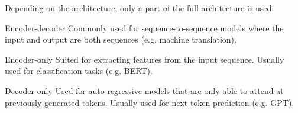 \begin{description}
        \begin{remark}
            Depending on the architecture, only a part of the full architecture is used:
            \begin{descriptionlist}
                \item[Encoder-decoder]
                    Commonly used for sequence-to-sequence models where the input and output are both sequences (e.g. machine translation).
                
                \item[Encoder-only]
                    Suited for extracting features from the input sequence.
                    Usually used for classification tasks (e.g. BERT).
                
                \item[Decoder-only]
                    Used for auto-regressive models that are only able to attend at previously generated tokens.
                    Usually used for next token prediction (e.g. GPT).
            \end{descriptionlist} 
        \end{remark}
\end{description}
